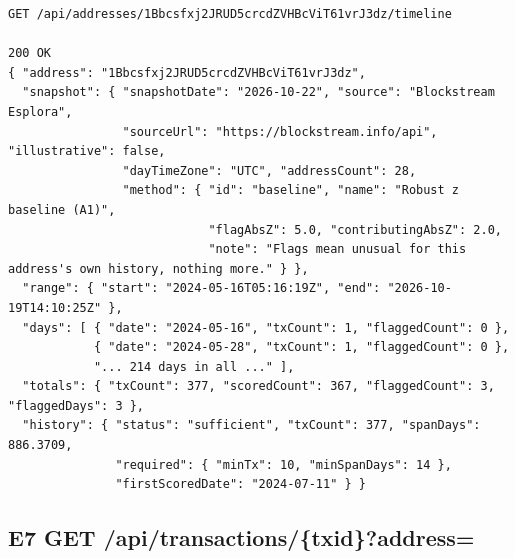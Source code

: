 \begin{lstlisting}[style=json]
GET /api/addresses/1Bbcsfxj2JRUD5crcdZVHBcViT61vrJ3dz/timeline

200 OK
{ "address": "1Bbcsfxj2JRUD5crcdZVHBcViT61vrJ3dz",
  "snapshot": { "snapshotDate": "2026-10-22", "source": "Blockstream Esplora",
                "sourceUrl": "https://blockstream.info/api", "illustrative": false,
                "dayTimeZone": "UTC", "addressCount": 28,
                "method": { "id": "baseline", "name": "Robust z baseline (A1)",
                            "flagAbsZ": 5.0, "contributingAbsZ": 2.0,
                            "note": "Flags mean unusual for this address's own history, nothing more." } },
  "range": { "start": "2024-05-16T05:16:19Z", "end": "2026-10-19T14:10:25Z" },
  "days": [ { "date": "2024-05-16", "txCount": 1, "flaggedCount": 0 },
            { "date": "2024-05-28", "txCount": 1, "flaggedCount": 0 },
            "... 214 days in all ..." ],
  "totals": { "txCount": 377, "scoredCount": 367, "flaggedCount": 3, "flaggedDays": 3 },
  "history": { "status": "sufficient", "txCount": 377, "spanDays": 886.3709,
               "required": { "minTx": 10, "minSpanDays": 14 },
               "firstScoredDate": "2024-07-11" } }
\end{lstlisting}

\subsection{E7 \quad GET /api/transactions/\{txid\}?address=}


